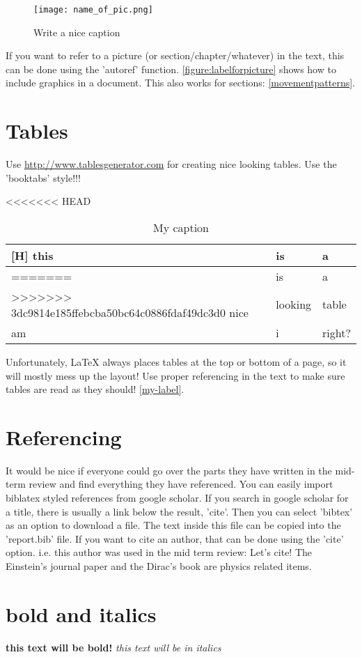 \begin{figure}[H]
\centering
\texttt{[image: name\_of\_pic.png]}
\captionsetup{justification=centering}
\caption{Write a nice caption}
\label{figure:labelforpicture}
\end{figure}

If you want to refer to a picture (or section/chapter/whatever) in the text, this can be done using the 'autoref' function. \autoref{figure:labelforpicture} shows how to include graphics in a document. This also works for sections: \autoref{movementpatterns}.

\section{Tables}
Use \url{http://www.tablesgenerator.com} for creating nice looking tables. Use the 'booktabs' style!!!
\begin{table}[H]
\centering
\caption{My caption}
\label{my-label}
<<<<<<< HEAD
\begin{tabular}{lll}[H]
\hline
this & is      & a      \\ \hline
=======
\begin{tabular}{@{}lll@{}}
\toprule
this & is      & a      \\ \midrule
>>>>>>> 3dc9814e185ffebcba50bc64c0886fdaf49dc3d0
nice & looking & table  \\
am   & i       & right? \\ \bottomrule
\end{tabular}
\end{table}
Unfortunately, LaTeX always places tables at the top or bottom of a page, so it will mostly mess up the layout! Use proper referencing in the text to make sure tables are read as they should! \autoref{my-label}.

\section{Referencing}
It would be nice if everyone could go over the parts they have written in the mid-term review and find everything they have referenced. You can easily import biblatex styled references from google scholar. If you search in google scholar for a title, there is usually a link below the result, 'cite'. Then you can select 'bibtex' as an option to download a file. The text inside this file can be copied into the 'report.bib' file. If you want to cite an author, that can be done using the 'cite' option. i.e. this author was used in the mid term review:
Let's cite! The Einstein's journal paper \cite{mautz2012indoor} and the Dirac's 
book \cite{meneses2012large} are physics related items. 

\section{bold and italics}
\textbf{this text will be bold!}
\textit{this text will be in italics}




